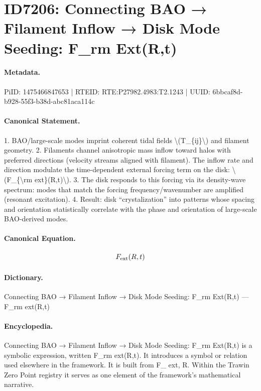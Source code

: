 \section*{ID7206: Connecting BAO → Filament Inflow → Disk Mode Seeding: F\_rm Ext(R,t)}
\paragraph{Metadata.}
PiID: 1475466847653 | RTEID: RTE:P27982.4983:T2.1243 | UUID: 6bbcaf8d-b928-55f3-b38d-abc81aca114c

\paragraph{Canonical Statement.}
1. BAO/large-scale modes imprint coherent tidal fields \textbackslash{}(T\_\{ij\}\textbackslash{}) and filament geometry. 2. Filaments channel anisotropic mass inflow toward halos with preferred directions (velocity streams aligned with filament). The inflow rate and direction modulate the time-dependent external forcing term on the disk: \textbackslash{}(F\_\{\textbackslash{}rm ext\}(R,t)\textbackslash{}). 3. The disk responds to this forcing via its density-wave spectrum: modes that match the forcing frequency/wavenumber are amplified (resonant excitation). 4. Result: disk “crystalization” into patterns whose spacing and orientation statistically correlate with the phase and orientation of large-scale BAO-derived modes.

\paragraph{Canonical Equation.}
\[
F_{\rm ext}(R,t)
\]

\paragraph{Dictionary.}
Connecting BAO → Filament Inflow → Disk Mode Seeding: F\_rm Ext(R,t) — F\_rm ext(R,t)

\paragraph{Encyclopedia.}
Connecting BAO → Filament Inflow → Disk Mode Seeding: F\_rm Ext(R,t) is a symbolic expression, written F\_rm ext(R,t). It introduces a symbol or relation used elsewhere in the framework. It is built from F\_ ext, R. Within the Trawin Zero Point registry it serves as one element of the framework's mathematical narrative.
